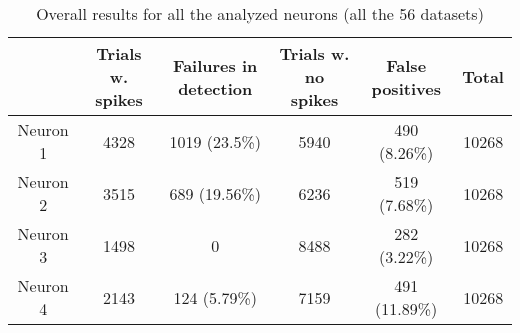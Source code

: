 \begin{table}[h!]
\begin{tabular}{|c|c|c|c|c|c|}
\hline
   &  Trials w. spikes & Failures in detection & Trials w. no spikes & False positives  & Total \\ \hline
   Neuron 1 & 4328 & 1019 (23.5\%) & 5940 & 490 (8.26\%) & 10268 \\ \hline
   Neuron 2 & 3515 & 689 (19.56\%) & 6236 & 519 (7.68\%)  & 10268\\ \hline
   Neuron 3 & 1498 & 0 & 8488 & 282 (3.22\%)& 10268  \\ \hline
   Neuron 4 & 2143 & 124 (5.79\%) & 7159 & 491 (11.89\%) & 10268  \\
  \hline
\end{tabular}
\caption{Overall results for all the analyzed neurons (all the 56 datasets)}
\end{table}


